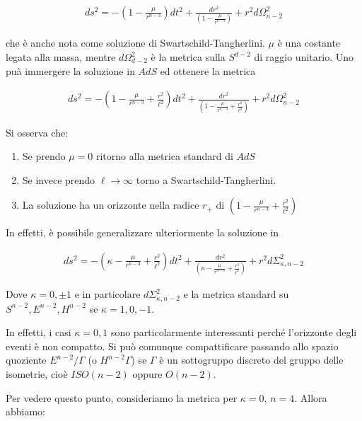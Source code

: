 \documentclass{report}
\begin{document}
\begin{align}
    ds^2 = -\left(1-\frac{\mu}{r^{n-3}} \right)dt^2 + \frac{dr^2}{\left(1-\frac{\mu}{r^{n-3}} \right)} + r^2 d\Omega^2_{n-2}
\end{align}

che è anche nota come soluzione di Swartschild-Tangherlini. \(\mu\) è una costante legata alla massa, mentre \(d\Omega^2_{d-2}\) è la metrica sulla \(S^{d-2}\) di raggio unitario. Uno puà immergere la soluzione in \(AdS\) ed ottenere la metrica 

\begin{align}
    ds^2 = -\left(1-\frac{\mu}{r^{n-3}} + \frac{r^2}{\ell^2}\right)dt^2 + \frac{dr^2}{\left(1-\frac{\mu}{r^{n-3}} + \frac{r^2}{\ell^2}\right)} + r^2 d\Omega^2_{n-2}
\end{align}

Si osserva che: 

\begin{enumerate}
    \item Se prendo \(\mu = 0\) ritorno alla metrica standard di \(AdS\)
    \item Se invece prendo \(\ell \rightarrow \infty\) torno a Swartschild-Tangherlini. 
    \item La soluzione ha un orizzonte nella radice \(r_+\) di \(\left(1-\frac{\mu}{r^{n-3}} + \frac{r^2}{\ell^2}\right)\)
\end{enumerate}

In effetti, è possibile generalizzare ulteriormente la soluzione in 

\begin{align}
    ds^2 = -\left(\kappa-\frac{\mu}{r^{n-3}} + \frac{r^2}{\ell^2}\right)dt^2 + \frac{dr^2}{\left(\kappa-\frac{\mu}{r^{n-3}} + \frac{r^2}{\ell^2}\right)} + r^2d\Sigma^2_{\kappa, n-2}
\end{align}


Dove \(\kappa = 0, \pm 1\) e in particolare \(d\Sigma^2_{\kappa, n-2}\) e la metrica standard su \(S^{n-2}, E^{n-2}, H^{n-2}\) se \(\kappa = 1, 0, -1\). 

In effetti, i casi \(\kappa = 0,1\) sono particolarmente interessanti perché l'orizzonte degli eventi è non compatto. Si può comunque compattificare passando allo spazio quoziente \(E^{n-2}/ \Gamma\) (o \(H^{n-2}\Gamma\)) se \(\Gamma\) è un sottogruppo discreto del gruppo delle isometrie, cioè \(ISO(n-2)\) oppure \(O(n-2)\). 

Per vedere questo punto, consideriamo la metrica per \(\kappa = 0, \, n=4\). Allora abbiamo: 
\end{document}
